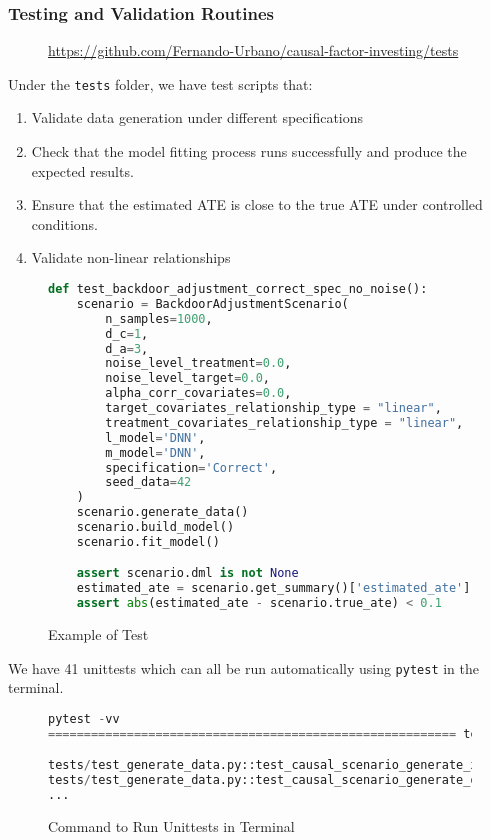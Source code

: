 \documentclass{article}
\numberwithin{equation}{section}
\begin{document}
\subsubsection{Testing and Validation Routines}

\begin{figure}[H]
    \centering
    \url{https://github.com/Fernando-Urbano/causal-factor-investing/tests}
\end{figure}

Under the \texttt{tests} folder, we have test scripts that:

\begin{enumerate}[label=\roman*.]
    \item Validate data generation under different specifications
    \item Check that the model fitting process runs successfully and produce the expected results.
    \item Ensure that the estimated ATE is close to the true ATE under controlled conditions.
    \item Validate non-linear relationships
\end{enumerate}

\begin{figure}[H]
\begin{lstlisting}[language=python]
def test_backdoor_adjustment_correct_spec_no_noise():
    scenario = BackdoorAdjustmentScenario(
        n_samples=1000,
        d_c=1,
        d_a=3,
        noise_level_treatment=0.0,
        noise_level_target=0.0,
        alpha_corr_covariates=0.0,
        target_covariates_relationship_type = "linear",
        treatment_covariates_relationship_type = "linear",
        l_model='DNN',
        m_model='DNN',
        specification='Correct',
        seed_data=42
    )
    scenario.generate_data()
    scenario.build_model()
    scenario.fit_model()

    assert scenario.dml is not None
    estimated_ate = scenario.get_summary()['estimated_ate'].iloc[0]
    assert abs(estimated_ate - scenario.true_ate) < 0.1
\end{lstlisting}
\caption{Example of Test}
\end{figure}

We have 41 unittests which can all be run automatically using \texttt{pytest} in the terminal.

\begin{figure}[H]
\begin{lstlisting}[language=python]
pytest -vv
========================================================= test session starts ==========================================================

tests/test_generate_data.py::test_causal_scenario_generate_x PASSED                                                               [  2%]
tests/test_generate_data.py::test_causal_scenario_generate_data PASSED                                                            [  5%]
...
\end{lstlisting}
\caption{Command to Run Unittests in Terminal}
\end{figure}
\end{document}
